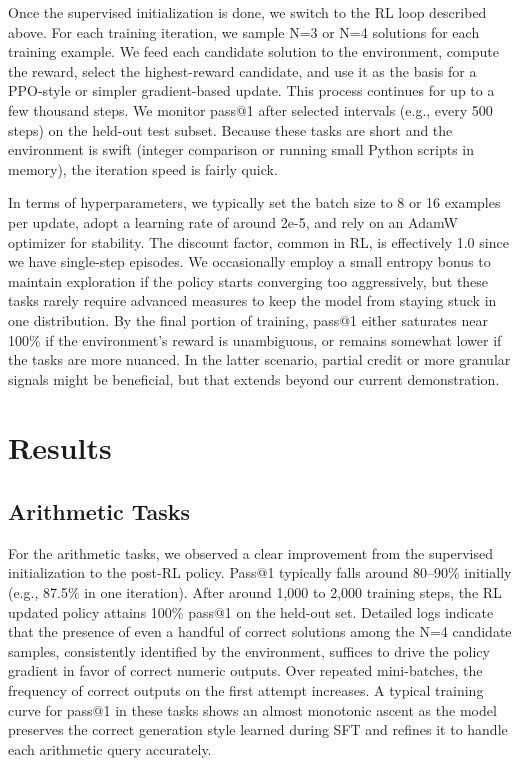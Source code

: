 \documentclass{article}
\begin{document}
Once the supervised initialization is done, we switch to the RL loop described above. For each training iteration, we sample N=3 or N=4 solutions for each training example. We feed each candidate solution to the environment, compute the reward, select the highest-reward candidate, and use it as the basis for a PPO-style or simpler gradient-based update. This process continues for up to a few thousand steps. We monitor pass@1 after selected intervals (e.g., every 500 steps) on the held-out test subset. Because these tasks are short and the environment is swift (integer comparison or running small Python scripts in memory), the iteration speed is fairly quick.

In terms of hyperparameters, we typically set the batch size to 8 or 16 examples per update, adopt a learning rate of around 2e-5, and rely on an AdamW optimizer for stability. The discount factor, common in RL, is effectively 1.0 since we have single-step episodes. We occasionally employ a small entropy bonus to maintain exploration if the policy starts converging too aggressively, but these tasks rarely require advanced measures to keep the model from staying stuck in one distribution. By the final portion of training, pass@1 either saturates near 100\% if the environment’s reward is unambiguous, or remains somewhat lower if the tasks are more nuanced. In the latter scenario, partial credit or more granular signals might be beneficial, but that extends beyond our current demonstration.

\section{Results}
\subsection{Arithmetic Tasks}
For the arithmetic tasks, we observed a clear improvement from the supervised initialization to the post-RL policy. Pass@1 typically falls around 80–90\% initially (e.g., 87.5\% in one iteration). After around 1,000 to 2,000 training steps, the RL updated policy attains 100\% pass@1 on the held-out set. Detailed logs indicate that the presence of even a handful of correct solutions among the N=4 candidate samples, consistently identified by the environment, suffices to drive the policy gradient in favor of correct numeric outputs. Over repeated mini-batches, the frequency of correct outputs on the first attempt increases. A typical training curve for pass@1 in these tasks shows an almost monotonic ascent as the model preserves the correct generation style learned during SFT and refines it to handle each arithmetic query accurately.
\end{document}
